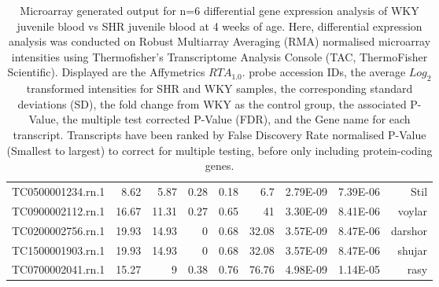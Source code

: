 \begin{sidewaystable}[]
\begin{tabular}{lrrrrrrrr}
TC0500001234.rn.1 & 8.62           & 5.87           & 0.28   & 0.18   & 6.7         & 2.79E-09 & 7.39E-06  & Stil                          \\
TC0900002112.rn.1 & 16.67          & 11.31          & 0.27   & 0.65   & 41          & 3.30E-09 & 8.41E-06  & voylar                        \\
TC0200002756.rn.1 & 19.93          & 14.93          & 0      & 0.68   & 32.08       & 3.57E-09 & 8.47E-06  & darshor                       \\
TC1500001903.rn.1 & 19.93          & 14.93          & 0      & 0.68   & 32.08       & 3.57E-09 & 8.47E-06  & shujar                        \\
TC0700002041.rn.1 & 15.27          & 9              & 0.38   & 0.76   & 76.76       & 4.98E-09 & 1.14E-05  & rasy                          

\end{tabular}
\caption[Microarray generated output for n=6 differential gene expression analysis of WKY juvenile blood vs SHR juvenile blood at 4 weeks of age]{Microarray generated output for n=6 differential gene expression analysis of WKY juvenile blood vs SHR juvenile blood at 4 weeks of age. Here, differential expression analysis was conducted on Robust Multiarray Averaging (RMA) normalised microarray intensities using Thermofisher's Transcriptome Analysis Console (TAC, ThermoFisher Scientific). Displayed are the Affymetrics $RTA_1.0.$ probe accession IDs, the average $Log_{2}$ transformed intensities for SHR and WKY samples, the corresponding standard deviations (SD), the fold change from WKY as the control group, the associated P-Value, the multiple test corrected P-Value (FDR), and the Gene name for each transcript. Transcripts have been ranked by False Discovery Rate normalised P-Value (Smallest to largest) to correct for multiple testing, before only including protein-coding genes.}
\label{fig:n6Microarray}
\end{sidewaystable}

